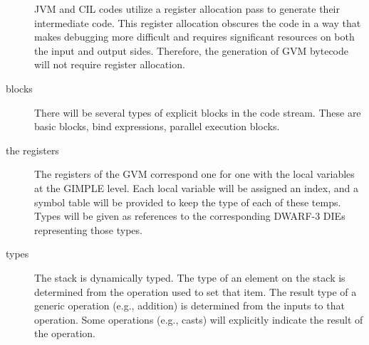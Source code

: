 \begin{description}
  JVM and CIL codes utilize a register allocation pass to generate
  their intermediate code. This register allocation obscures the code
  in a way that makes debugging more difficult and requires
  significant resources on both the input and output sides.  Therefore,
  the generation of GVM bytecode will not require register allocation.

\item[blocks] There will be several types of explicit blocks in the
  code stream. These are basic blocks, bind expressions, parallel
  execution blocks.  

\item[the registers] The registers of the GVM correspond one for one
  with the local variables at the GIMPLE level.  Each local variable
  will be assigned an index, and a symbol table will be provided to
  keep the type of each of these temps.  Types will be given as 
  references to the corresponding DWARF-3 DIEs representing those
  types.

\item[types] The stack is dynamically typed.  The type of an element on the
  stack is determined from the operation used to set that item.  The
  result type of a generic operation (e.g., addition) is determined
  from the inputs to that operation.  Some operations (e.g., casts)
  will explicitly indicate the result of the operation.

\end{description}
